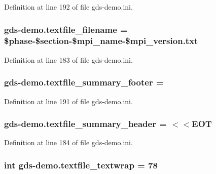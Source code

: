 Definition at line 192 of file gds-\/demo.\-ini.

\hypertarget{namespacegds-demo_a210b065329c1196c2b4205f4e4e8db53}{
\subsubsection[{textfile\-\_\-filename}]{\setlength{\rightskip}{0pt plus 5cm}gds-\/demo.\-textfile\-\_\-filename = \$phase-\/\$section-\/\$mpi\-\_\-name-\/\$mpi\-\_\-version.\-txt}}\label{namespacegds-demo_a210b065329c1196c2b4205f4e4e8db53}


Definition at line 183 of file gds-\/demo.\-ini.

\hypertarget{namespacegds-demo_a7791b144751668f4a2bd3aabde7ec607}{
\subsubsection[{textfile\-\_\-summary\-\_\-footer}]{\setlength{\rightskip}{0pt plus 5cm}gds-\/demo.\-textfile\-\_\-summary\-\_\-footer =}}\label{namespacegds-demo_a7791b144751668f4a2bd3aabde7ec607}


Definition at line 191 of file gds-\/demo.\-ini.

\hypertarget{namespacegds-demo_a211b7a2e48808f11b61bcb2bae18d23f}{
\subsubsection[{textfile\-\_\-summary\-\_\-header}]{\setlength{\rightskip}{0pt plus 5cm}gds-\/demo.\-textfile\-\_\-summary\-\_\-header = $<$$<$E\-O\-T}}\label{namespacegds-demo_a211b7a2e48808f11b61bcb2bae18d23f}


Definition at line 184 of file gds-\/demo.\-ini.

\hypertarget{namespacegds-demo_aaaa191ed09a9a9150e323f1f49713812}{
\subsubsection[{textfile\-\_\-textwrap}]{\setlength{\rightskip}{0pt plus 5cm}int gds-\/demo.\-textfile\-\_\-textwrap = 78}}\label{namespacegds-demo_aaaa191ed09a9a9150e323f1f49713812}


